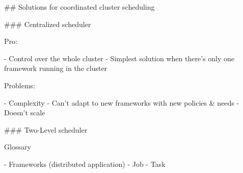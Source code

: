 ## Solutions for coordinated cluster scheduling

### Centralized scheduler

Pro:

- Control over the whole cluster
- Simplest solution when there's only one framework running in the cluster

Problems:

- Complexity
- Can't adapt to new frameworks with new policies & needs
- Doesn't scale

### Two-Level scheduler



Glossary

- Frameworks (distributed application)
- Job
- Task
